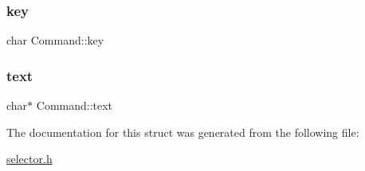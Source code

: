 \mbox{\label{structCommand_a1576dea54d8389ef3015c3098a0bb221}} 
\subsubsection{\texorpdfstring{key}{key}}
{\footnotesize\ttfamily char Command\+::key}

\mbox{\label{structCommand_a7eb229bb0f1913e0ed19bb200674b3ae}} 
\subsubsection{\texorpdfstring{text}{text}}
{\footnotesize\ttfamily char$\ast$ Command\+::text}



The documentation for this struct was generated from the following file\+:\begin{DoxyCompactItemize}
\item 
\hyperlink{selector_8h}{selector.\+h}\end{DoxyCompactItemize}
